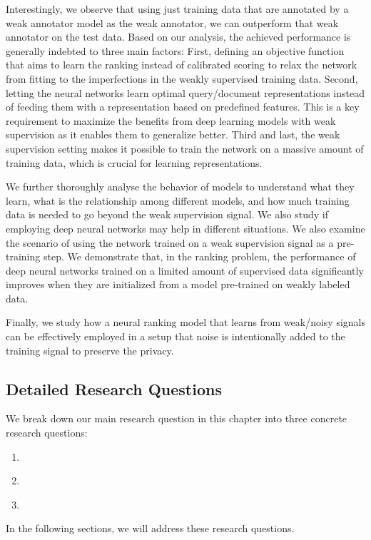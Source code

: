 Interestingly, we observe that using just training data that are annotated by a weak annotator model as the weak annotator, we can outperform that weak annotator on the test data. Based on our analysis, the achieved performance is generally indebted to three main factors: 
%
First, defining an objective function that aims to learn the ranking instead of calibrated scoring to relax the network from fitting to the imperfections in the weakly supervised training data.
%
Second, letting the neural networks learn optimal query/document representations instead of feeding them with a representation based on predefined features. This is a key requirement to maximize the benefits from deep learning models with weak supervision as it enables them to generalize better.
%
Third and last, the weak supervision setting makes it possible to train the network on a massive amount of training data, which is crucial for learning representations.
%

We further thoroughly analyse the behavior of models to understand what they learn, what is the relationship among different models, and how much training data is needed to go beyond the weak supervision signal. We also study if employing deep neural networks may help in different situations.
%
We also examine the scenario of using the network trained on a weak supervision signal as a pre-training step. We demonstrate that, in the ranking problem, the performance of deep neural networks trained on a limited amount of supervised data significantly improves when they are initialized from a model pre-trained on weakly labeled data.

Finally, we study how a neural ranking model that learns from weak/noisy signals can be effectively employed in a setup that noise is intentionally added to the training signal to preserve the privacy.


\subsection{Detailed Research Questions}
We break down our main research question in this chapter into three concrete research questions:
\begin{resqbox}
\begin{enumerate}
\item[\textbf{\resqname{c4.1}}] \emph{}
\item[\textbf{\resqname{c4.2}}] \emph{}
\item[\textbf{\resqname{c4.3}}] \emph{}
\end{enumerate}
\end{resqbox}
In the following sections, we will address these research questions.





